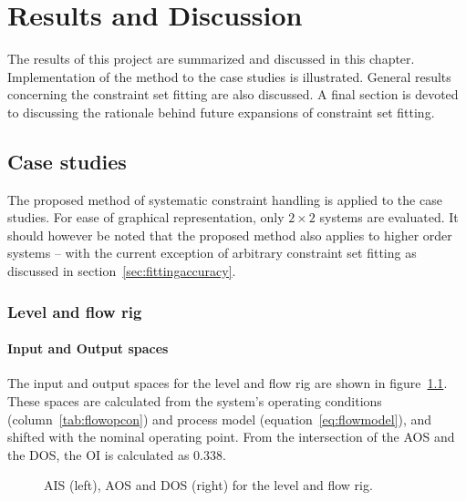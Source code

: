 \chapter{Results and Discussion}\label{chap:results}
\begin{overview}
  The results of this project are summarized and discussed in this chapter.
  Implementation of the method to the case studies is illustrated.
  General results concerning the constraint set fitting are also discussed.
  A final section is devoted to discussing the rationale behind future expansions of constraint set fitting.
\end{overview}

\section{Case studies}
The proposed method of systematic constraint handling is applied to the case studies.
For ease of graphical representation, only $2\times2$ systems are evaluated.
It should however be noted that the proposed method also applies to higher order systems -- with the current exception of arbitrary constraint set fitting as discussed in section~\ref{sec:fittingaccuracy}.

\subsection{Level and flow rig}

\subsubsection{Input and Output spaces}
The input and output spaces for the level and flow rig are shown in figure~\ref{fig:flowaisaos}.
These spaces are calculated from the system's operating conditions (column~\ref{tab:flowopcon}) and process model (equation~\ref{eq:flowmodel}), and shifted with the nominal operating point.
From the intersection of the AOS and the DOS, the OI is calculated as 0.338.

\begin{figure}[htbp]
  \centering
    \scalebox{1}{}  
    \scalebox{1}{}  
  \caption[AIS, AOS and DOS of the level and flow rig]{AIS (left), AOS and DOS (right) for the level and flow rig.}
  \label{fig:flowaisaos}
\end{figure}

